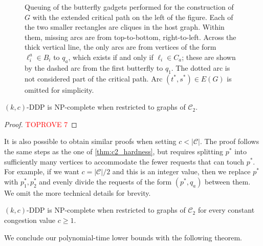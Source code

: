 \documentclass[a4paper,UKenglish,cleveref, autoref, thm-restate]{lipics-v2021}
\renewcommand{\NP}{{\sf NP}\xspace}
\newcommand{\pname}[1]{{\sc #1}}
\newcommand{\congestion}{c}
\begin{document}
\begin{figure}[!htb]
  \caption{Queuing of the butterfly gadgets performed for the construction of $G$ with
    the extended critical path on the left of the figure. Each of the two smaller
    rectangles are cliques in the host graph. Within them, missing arcs are from
    top-to-bottom, right-to-left. Across the thick vertical line, the only arcs are from vertices
    of the form $\ell^a_i \in B_i$ to $q_a$, which exists if and only if $\ell_i \in
    C_a$; these are shown by the dashed arc from the first butterfly to $q_1$. The dotted
    arc is not considered part of the critical path. Arc $(t^*, s^*) \in E(G)$ is omitted
    for simplicity.
  \label{fig:queued_butterfly2}}
\end{figure}

\begin{theorem}
  \label{thm:c2_hardness}
  \pname{$(k,c)$-DDP} is \NP-complete when restricted to graphs of
  $\mathcal{C}_2$.
\end{theorem}

\begin{proof}\textcolor{red}{TOPROVE 7}\end{proof}

It is also possible to obtain similar proofs when setting $\congestion < |\mathcal{C}|$.
The proof follows the same steps as the one of \autoref{thm:c2_hardness}, but
requires splitting $p^*$ into sufficiently many vertices to accommodate the fewer
requests that can touch $p^*$. For example, if we want $\congestion = |\mathcal{C}|/2$
and this is an integer value, then we replace $p^*$ with $p^*_1, p^*_2$ and evenly divide
the requests of the form $(p^*, q_a)$ between them. We omit the more technical details for brevity.

\begin{theorem}
  \label{thm:c2_hardness_cte_ratio}
  \pname{$(k,c)$-DDP} is \NP-complete when restricted to graphs of
  $\mathcal{C}_2$ for every constant congestion value $\congestion \geq 1$.
\end{theorem}

We conclude our polynomial-time lower bounds with the following theorem.
\end{document}
